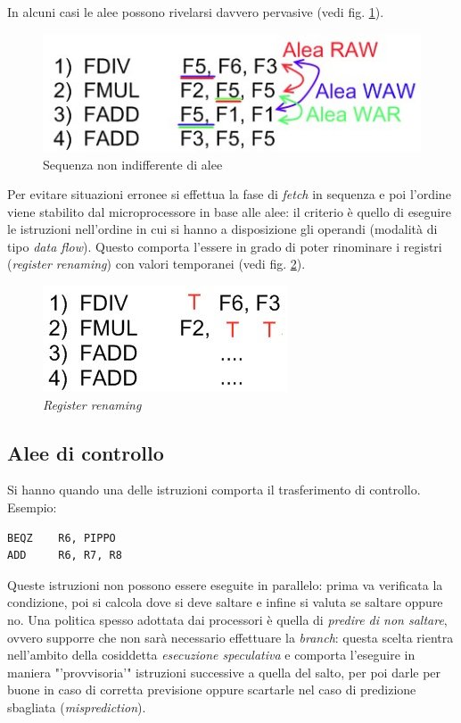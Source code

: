 In alcuni casi le alee possono rivelarsi davvero pervasive (vedi fig. \ref{fig:aleeABalusa}).
\begin{figure}[!h]
\centering
\includegraphics[width=0.5\columnwidth]{img/aleeABalusa}
\caption{Sequenza non indifferente di alee}
\label{fig:aleeABalusa}
\end{figure}
Per evitare situazioni erronee si effettua la fase di \textit{fetch} in sequenza e poi l'ordine viene stabilito dal microprocessore in base alle alee: il criterio è quello di eseguire le istruzioni nell'ordine in cui si hanno a disposizione gli operandi (modalità di tipo \textit{data flow}).
Questo comporta l'essere in grado di poter rinominare i registri (\textit{register renaming}) con valori temporanei (vedi fig. \ref{fig:aleeABalusa2}).
\begin{figure}[!h]
\centering
\includegraphics[width=0.3\columnwidth]{img/aleeABalusa2}
\caption{\textit{Register renaming}}
\label{fig:aleeABalusa2}
\end{figure}

\subsection{Alee di controllo}
\label{sec:aleeControllo}

Si hanno quando una delle istruzioni comporta il trasferimento di controllo.
Esempio:
\begin{verbatim}
BEQZ    R6, PIPPO
ADD     R6, R7, R8
\end{verbatim}
Queste istruzioni non possono essere eseguite in parallelo: prima va verificata la condizione, poi si calcola dove si deve saltare e infine si valuta se saltare oppure no. Una politica spesso adottata dai processori è quella di \textit{predire di non saltare}, ovvero supporre che non sarà necessario effettuare la \textit{branch}: questa scelta rientra nell'ambito della cosiddetta \textit{esecuzione speculativa} e comporta l'eseguire in maniera "'provvisoria'" istruzioni successive a quella del salto, per poi darle per buone in caso di corretta previsione oppure scartarle nel caso di predizione sbagliata (\textit{misprediction}).

